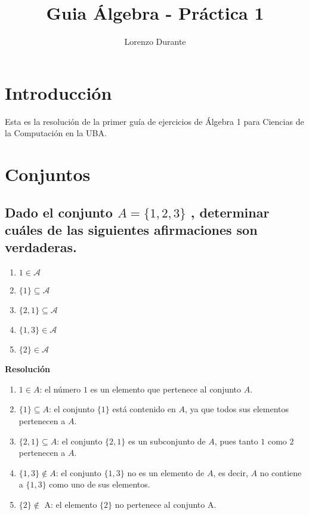 \documentclass{article}
\title{Guia Álgebra - Práctica 1}
\author{Lorenzo Durante}
\begin{document}
\maketitle

\section{Introducción}
{Esta es la resolución de la primer guía de ejercicios de Álgebra 1 para Ciencias de la Computación en la UBA.}

\section{Conjuntos}
\subsection{Dado el conjunto $A = \{ 1, 2, 3\}$ , determinar cuáles de las siguientes afirmaciones son verdaderas.}

\begin{enumerate}[label=\roman*)]
    \item $1 \in \mathcal{A}$
    \item $\{1\} \subseteq \mathcal{A}$
    \item $\{2,1\} \subseteq \mathcal{A}$
    \item $\{1,3\} \in \mathcal{A}$
    \item $\{2\} \in \mathcal{A}$
\end{enumerate}
\textbf{Resolución}
\begin{enumerate}[label=\roman*)]
    \item $1 \in A$: el número $1$ es un elemento que pertenece al conjunto $A$.
    
    \item $\{1\} \subseteq A$: el conjunto $\{1\}$ está contenido en $A$, ya que todos sus elementos pertenecen a $A$.
    
    \item $\{2,1\} \subseteq A$: el conjunto $\{2,1\}$ es un subconjunto de $A$, pues tanto $1$ como $2$ pertenecen a $A$.
    
    \item $\{1,3\} \notin A$: el conjunto $\{1,3\}$ no es un elemento de $A$, es decir, $A$ no contiene a $\{1,3\}$ como uno de sus elementos.
    \item $\{2\} \notin$ A: el elemento $\{2\}$ no pertenece al conjunto A. 
\end{enumerate}
\end{document}
